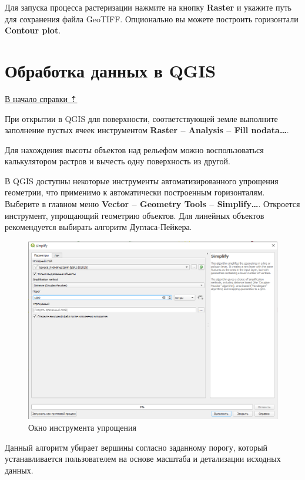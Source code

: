 \documentclass[
  12pt,
]{book}
\begin{document}
Для запуска процесса растеризации нажмите на кнопку \textbf{Raster} и укажите путь для сохранения файла GeoTIFF. Опционально вы можете построить горизонтали \textbf{Contour plot}.

\hypertarget{las-qgis}{%
\section{Обработка данных в QGIS}\label{las-qgis}}

\protect\hyperlink{las}{В начало справки ⇡}

При открытии в QGIS для поверхности, соответствующей земле выполните заполнение пустых ячеек инструментом \textbf{Raster -- Analysis -- Fill nodata\ldots{}}.

Для нахождения высоты объектов над рельефом можно воспользоваться калькулятором растров и вычесть одну поверхность из другой.

В QGIS доступны некоторые инструменты автоматизированного упрощения геометрии, что применимо к автоматически построенным горизонталям. Выберите в главном меню \textbf{Vector -- Geometry Tools -- Simplify\ldots{}}. Откроется инструмент, упрощающий геометрию объектов. Для линейных объектов рекомендуется выбирать алгоритм Дугласа-Пейкера.

\begin{figure}
\centering
\includegraphics{images/Ref19/Simplify.png}
\caption{Окно инструмента упрощения}
\end{figure}

Данный алгоритм убирает вершины согласно заданному порогу, который устанавливается пользователем на основе масштаба и детализации исходных данных.
\end{document}
